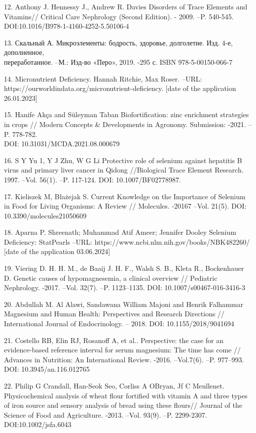 \begin{noparindent}
12. Anthony J. Hennessy J., Andrew R. Davies Disorders of Trace Elements
and Vitamins// Critical Care Nephrology (Second Edition). - 2009. --P.
540-545. DOI:10.1016/B978-1-4160-4252-5.50106-4

13. Скальный А. Микроэлементы: бодрость, здоровье, долголетие. Изд. 4-е,
дополненное, \\переработанное. --М.: Изд-во «Перо», 2019. -295 с. ISBN
978-5-00150-066-7

14. Micronutrient Deficiency. Hannah Ritchie, Max Roser. --URL:
https://ourworldindata.org/micronutrient-deficiency. {[}date of the
application 26.01.2023{]}

15. Hanife Akça and Süleyman Taban Biofortification: zinc enrichment
strategies in crops // Modern Concepts \& Developments in Agronomy.
Submission: -2021. --P. 778-782. \\DOI: 10.31031/MCDA.2021.08.000679

16. S Y Yu 1, Y J Zhu, W G Li Protective role of selenium against
hepatitis B virus and primary liver cancer in Qidong //Biological Trace
Element Research. 1997. --Vol. 56(1). --P. 117-124. DOI:
10.1007/BF02778987.

17. Kieliszek M, Błażejak S. Current Knowledge on the Importance of
Selenium in Food for Living Organisms: A Review // Molecules. -20167
--Vol. 21(5). DOI: 10.3390/molecules21050609

18. Aparna P. Shreenath; Muhammad Atif Ameer; Jennifer Dooley Selenium
Deficiency: StatPearls --URL:
https://www.ncbi.nlm.nih.gov/books/NBK482260/ {[}date of the application
03.06.2024{]}

19. Viering D. H. H. M., de Baaij J. H. F., Walsh S. B., Kleta R.,
Bockenhauer D. Genetic causes of hypomagnesemia, a clinical overview //
Pediatric Nephrology. -2017. --Vol. 32(7). --P. 1123--1135. DOI:
10.1007/s00467-016-3416-3

20. Abdullah M. Al Alawi, Sandawana William Majoni and Henrik Falhammar
Magnesium and Human Health: Perspectives and Research Directions //
International Journal of Endocrinology. -- 2018. DOI:
10.1155/2018/9041694

21. Costello RB, Elin RJ, Rosanoff A, et al.. Perspective: the case for
an evidence-based reference interval for serum magnesium: The time has
come // Advances in Nutrition: An International Review. -2016.
--Vol.7(6). --P. 977--993. DOI: 10.3945/an.116.012765

22. Philip G Crandall, Han-Seok Seo, Corliss A O\textquotesingle Bryan,
Jf C Meullenet. Physicochemical analysis of wheat flour fortified with
vitamin A and three types of iron source and sensory analysis of bread
using these flours// Journal of the Science of Food and Agriculture.
-2013. --Vol. 93(9). --P. 2299-2307. \\DOI:10.1002/jsfa.6043


\end{noparindent}
